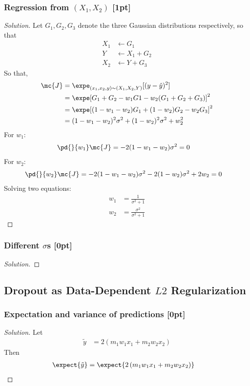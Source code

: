 \documentclass{article}
\begin{document}
	\subsubsection{Regression from $(X_1, X_2)$ [1pt]}
	\begin{proof}[Solution]
		Let $G_1, G_2, G_3$ denote the three Gaussian distributions respectively, so that
		\begin{align}
			X_1 &\leftarrow G_1 \\
			Y &\leftarrow X_1 + G_2 \\
			X_2 &\leftarrow Y + G_3
		\end{align}
		So that,
		\begin{align}
			\mc{J} &= \expe_{(x_1, x_2, y) \sim (X_1, X_2, Y)} [(y - \hat{y})^2] \\
			&= \expe [G_1 + G_2 - w_1 G1 - w_2 (G_1 + G_2 + G_3)]^2 \\
			&= \expe [(1 - w_1 - w_2)G_1 + (1 - w_2)G_2 - w_2 G_3 ]^2 \\
			&= (1-w_1-w_2)^2 \sigma^2 + (1 - w_2)^2 \sigma^2 + w_2^2
		\end{align}
		For $w_1$:
		\begin{align}
			&\pd{}{w_1} \mc{J} = - 2 (1 - w_1 - w_2) \sigma^2 = 0
		\end{align}
		For $w_2$:
		\begin{align}
			&\pd{}{w_2} \mc{J}
			= - 2 (1 - w_1 - w_2) \sigma^2 
			- 2 (1 - w_2) \sigma^2
			+ 2 w_2 = 0 
		\end{align}
		Solving two equations:
		\begin{align}
			w_1 &= \frac{1}{\sigma ^2+1} \\
			w_2 &= \frac{\sigma ^2}{\sigma ^2+1}
		\end{align}
	\end{proof}
	
	\subsubsection{Different $\sigma$s [0pt]}
	\begin{proof}[Solution]
		
	\end{proof}
	
	\subsection{Dropout as Data-Dependent $L2$ Regularization}
	\subsubsection{Expectation and variance of predictions [0pt]}
	\begin{proof}[Solution]
		Let
		\begin{align}
			\tilde{y} &= 2\left(m_{1} w_{1} x_{1}+m_{2} w_{2} x_{2}\right)
		\end{align}
		Then
		\begin{align}
			\expect{\tilde{y}} &= \expect{2\left(m_{1} w_{1} x_{1}+m_{2} w_{2} x_{2}\right)}
		\end{align}
	\end{proof}
	
\end{document}

